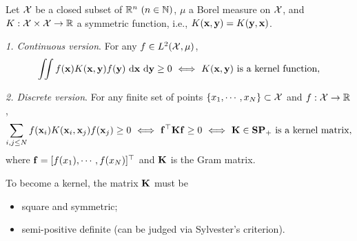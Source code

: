 \begin{theorem}
	Let $\mathcal{X}$ be a closed subset of $ \mathbb{R}^n\ (n \in \mathbb{N})$, $\mu$ a Borel measure on $\mathcal{X}$, and $K: \mathcal{X} \times \mathcal{X} \rightarrow \mathbb{R}$ a symmetric function, i.e., $K(\mathbf{x}, \mathbf{y}) = K(\mathbf{y}, \mathbf{x})$. 
	
	\emph{1. Continuous version}. For any $f \in L^2(\mathcal{X}, \mu)$, 
	$$
	\iint f(\mathbf{x}) K(\mathbf{x}, \mathbf{y}) f(\mathbf{y}) \ \mathrm{d}\mathbf{x} \ \mathrm{d}\mathbf{y} \geq 0 \ \Longleftrightarrow\ K(\mathbf{x}, \mathbf{y})\text{ is a kernel function},
	$$	
	
	\emph{2. Discrete version}. For any finite set of points $\{x_1, \cdots, x_N\} \subset \mathcal{X}$ and $f: \mathcal{X} \rightarrow \mathbb{R}$,
	$$
	\sum_{i, j \leq N} f(\bfx_i) K(\bfx_i, \bfx_j) f(\bfx_j) \geq 0 \ \Longleftrightarrow\  \bff^\top \bfK \bff \geq 0  \ \Longleftrightarrow\  \bfK \in \mathbf{SP_{+}} \text{ is a kernel matrix},
	$$
	where $\mathbf{f} = [f(x_1), \cdots, f(x_N)]^\top$ and $\mathbf{K}$ is the Gram matrix.
\end{theorem}
\remark To become a kernel, the matrix $\mathbf{K}$ must be
\begin{itemize}
	\item square and symmetric;
	\item semi-positive definite (can be judged via Sylvester's criterion).
\end{itemize} 


